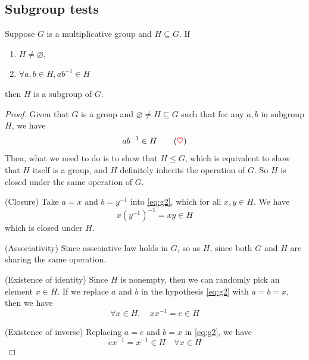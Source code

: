 \subsection{Subgroup tests}

\begin{theorem}
    Suppose $G$ is a multiplicative group and $H \subseteq G$. If 
    \begin{enumerate}
        \item $H \neq \varnothing$,
        \item $\forall a, b \in H, ab^{-1} \in H$
    \end{enumerate}
    then $H$ is a subgroup of $G$. 
\end{theorem}
\begin{proof}
    Given that $G$ is a group and $\varnothing \neq H \subseteq G$ such that for any $a, b$ in subgroup $H$, we have 
    \begin{equation*}
        ab^{-1} \in H   \label{eq:g2} \tag{{\color{red} $\heartsuit $}}
    \end{equation*}
    Then, what we need to do is to show that $H \leq G$, which is equivalent to show that $H$ itself is a group, and $H$ 
    definitely inherits the operation of $G$. So $H$ is closed under the same operation of $G$.

    (Closure) Take $a = x$ and $b = y^{-1}$ into \eqref{eq:g2}, which for all $x, y \in H$. We have 
    \[
        x(y^{-1})^{-1} = xy \in H
    \]
    which is closed under $H$.

    (Associativity) Since asscoiative law holds in $G$, so as $H$, since both $G$ and $H$ are sharing the 
    same operation.
    
    (Existence of identity) Since $H$ is nonempty, then we can randomly pick an element $x \in H$. If we 
    replace $a$ and $b$ in the hypothesis \eqref{eq:g2} with $a = b = x$, then we have 
    \[
        \forall x \in H,\quad xx^{-1} = e \in H
    \]

    (Existence of inverse) Replacing $a = e$ and $b = x$ in \eqref{eq:g2}, we have 
    \[
        ex^{-1} = x^{-1} \in H \quad \forall x \in H 
    \]
\end{proof}

